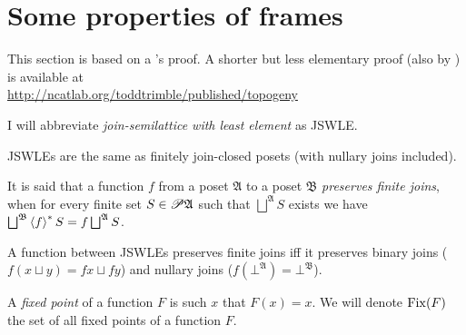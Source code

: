 \section{Some properties of frames}\label{some-frames}

This section is based on a 's proof. A shorter
but less elementary proof (also by ) is available
at\\
\href{http://ncatlab.org/toddtrimble/published/topogeny}{http://ncatlab.org/toddtrimble/published/topogeny}

I will abbreviate \emph{join-semilattice with least element} as JSWLE.
\begin{obvious}
JSWLEs are the same as finitely join-closed posets (with nullary joins
included).
\end{obvious}

\begin{defn}
It is said that a function $f$ from a poset $\mathfrak{A}$ to a
poset $\mathfrak{B}$ \emph{preserves finite joins}, when for every
finite set $S\in\mathscr{P}\mathfrak{A}$ such that $\bigsqcup^{\mathfrak{A}}S$
exists we have $\bigsqcup^{\mathfrak{B}}\supfun f^{\ast}S=f\bigsqcup^{\mathfrak{A}}S$.\end{defn}
\begin{obvious}
A function between JSWLEs preserves finite joins iff it preserves
binary joins ($f(x\sqcup y)=fx\sqcup fy$) and nullary joins ($f(\bot^{\mathfrak{A}})=\bot^{\mathfrak{B}}$).\end{obvious}
\begin{defn}
A \emph{fixed point} of a function $F$ is such $x$ that $F(x)=x$.
We will denote $\operatorname{Fix}(F)$ the set of all fixed points of a function
$F$.
\end{defn}

